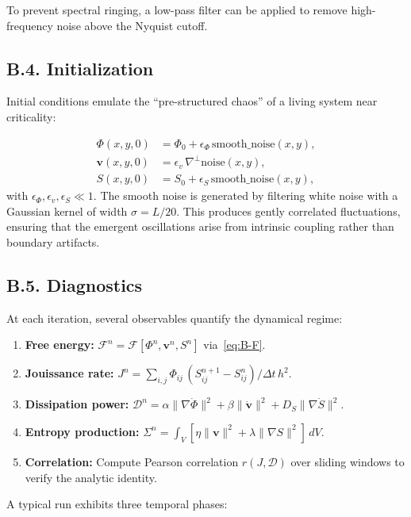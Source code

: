 \documentclass[12pt,a4paper]{article}
\begin{document}
To prevent spectral ringing, a low-pass filter can be applied to remove high-frequency noise above the Nyquist cutoff.

\subsection*{B.4. Initialization}

Initial conditions emulate the “pre-structured chaos” of a living system near criticality:

\begin{align*}
\Phi(x,y,0) &= \Phi_0 + \epsilon_\Phi\,\text{smooth\_noise}(x,y),\\
\mathbf{v}(x,y,0) &= \epsilon_v\,\nabla^\perp\!\text{noise}(x,y),\\
S(x,y,0) &= S_0 + \epsilon_S\,\text{smooth\_noise}(x,y),
\end{align*}
with \(\epsilon_\Phi,\epsilon_v,\epsilon_S\ll1\).
The smooth noise is generated by filtering white noise with a Gaussian kernel of width \(\sigma=L/20\).
This produces gently correlated fluctuations, ensuring that the emergent oscillations arise from intrinsic coupling rather than boundary artifacts.

\subsection*{B.5. Diagnostics}

At each iteration, several observables quantify the dynamical regime:

\begin{enumerate}[leftmargin=1.2em]
\item \textbf{Free energy:}
\(\mathcal{F}^n = \mathcal{F}[\Phi^n,\mathbf{v}^n,S^n]\) via~\eqref{eq:B-F}.  
\item \textbf{Jouissance rate:}
\(J^n = \sum_{i,j}\Phi_{ij}\,(\!S_{ij}^{n+1}-S_{ij}^{n})/\Delta t \, h^2\).  
\item \textbf{Dissipation power:}
\(\mathcal{D}^n = \alpha\|\nabla\dot{\Phi}\|^2+\beta\|\dot{\mathbf{v}}\|^2+D_S\|\nabla\dot{S}\|^2\).  
\item \textbf{Entropy production:}
\(\Sigma^n = \int_V [\eta\|\mathbf{v}\|^2+\lambda\|\nabla S\|^2]\,dV.\)
\item \textbf{Correlation:}
Compute Pearson correlation \(r(J,\mathcal{D})\) over sliding windows to verify the analytic identity.  
\end{enumerate}

A typical run exhibits three temporal phases:
\end{document}
